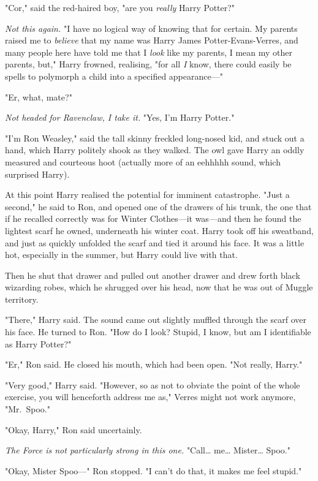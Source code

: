 "Cor," said the red-haired boy, "are you \emph{really} Harry Potter?"

\emph{Not this again.} "I have no logical way of knowing that for certain. My
parents raised me to \emph{believe} that my name was Harry James
Potter-Evans-Verres, and many people here have told me that I \emph{look} like
my parents, I mean my other parents, but," Harry frowned, realising, "for all
\emph{I} know, there could easily be spells to polymorph a child into a
specified appearance---"

"Er, what, mate?"

\emph{Not headed for Ravenclaw, I take it.} "Yes, I'm Harry Potter."

"I'm Ron Weasley," said the tall skinny freckled long-nosed kid, and stuck out
a hand, which Harry politely shook as they walked. The owl gave Harry an oddly
measured and courteous hoot (actually more of an eehhhhh sound, which surprised
Harry).

At this point Harry realised the potential for imminent catastrophe. "Just a
second," he said to Ron, and opened one of the drawers of his trunk, the one
that if he recalled correctly was for Winter Clothes---it was---and then he
found the lightest scarf he owned, underneath his winter coat. Harry took off
his sweatband, and just as quickly unfolded the scarf and tied it around his
face. It was a little hot, especially in the summer, but Harry could live with
that.

Then he shut that drawer and pulled out another drawer and drew forth black
wizarding robes, which he shrugged over his head, now that he was out of Muggle
territory.

"There," Harry said. The sound came out slightly muffled through the scarf over
his face. He turned to Ron. "How do I look? Stupid, I know, but am I
identifiable as Harry Potter?"

"Er," Ron said. He closed his mouth, which had been open. "Not really, Harry."

"Very good," Harry said. "However, so as not to obviate the point of the whole
exercise, you will henceforth address me as," Verres might not work anymore,
"Mr.~Spoo."

"Okay, Harry," Ron said uncertainly.

\emph{The Force is not particularly strong in this one.} "Call{\ldots}
me{\ldots} Mister{\ldots} Spoo."

"Okay, Mister Spoo---" Ron stopped. "I can't do that, it makes me feel stupid."

